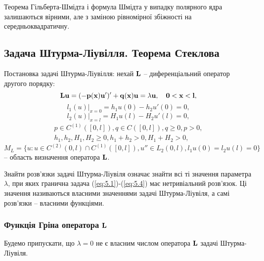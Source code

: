 \begin{remark}
    Теорема Гільберта-Шмідта і формула Шмідта у випадку полярного ядра залишаються вірними, але з заміною рівномірної збіжності на середньоквадратичну.
\end{remark}

\subsection{Задача Штурма-Ліувілля. Теорема Стеклова}

Постановка задачі Штурма-Ліувілля: нехай $\bf{L}$ -- диференціальний оператор другого порядку:
\begin{equation}
    \label{eq:5.1}
    \bf{L}u=(-p(x)u')'+q(x)u=\lambda u,\quad0<x<l,
\end{equation}
\begin{equation}
    \label{eq:5.2}
    l_1(u)|_{x=0}=h_1u(0)-h_2u'(0)=0,
\end{equation}
\begin{equation}
    \label{eq:5.3}
    l_2(u)|_{x=l}=H_1u(l)-H_2u'(l)=0,
\end{equation}
\begin{multline}
    \label{eq:5.4}
    p\in C^{(1)}([0,l]), q\in C([0,l]), q\ge0, p>0, \\
    h_1, h_2, H_1, H_2 \ge 0, h_1+h_2>0, H_1+H_2>0,
\end{multline}
\begin{equation}
    \label{eq:5.5}
    M_L=\{u:u\in C^{(2)}(0,l)\cap C^{(1)}([0,l]), u''\in L_2(0,l), l_1u(0)=l_2u(l)=0\}
\end{equation}
-- область визначення оператора $\bf{L}$.

\begin{definition}
    Знайти розв’язки задачі Штурма-Ліувіля означає знайти всі ті значення параметра $\lambda$, при яких гранична задача (\ref{eq:5.1})-(\ref{eq:5.4}) має нетривіальний розв’язок. Ці значення називаються власними значеннями задачі Штурма-Ліувіля, а самі розв’язки -- власними функціями.
\end{definition}

\subsubsection{Функція Гріна оператора $\bf{L}$}

Будемо припускати, що $\lambda = 0$ не є власним числом оператора $\bf{L}$ задачі Штурма-Ліувіля. \\

